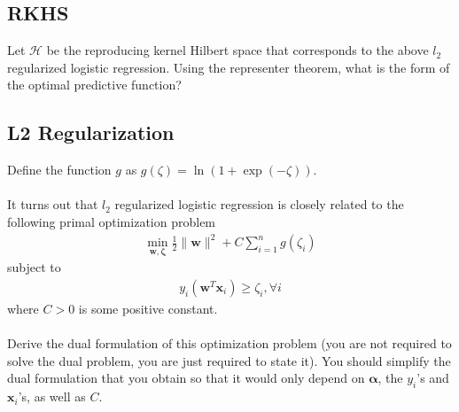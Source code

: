 \documentclass{exam}
\newcommand{\wv}{\boldsymbol{w}}
\newcommand{\xv}{\boldsymbol{x}}
\begin{document}
\subsection{RKHS} Let $\mathcal{H}$ be the reproducing kernel Hilbert space that corresponds to the above $l_2$ regularized logistic regression. Using the representer theorem, what is the form of the optimal predictive function? 

\subsection{L2 Regularization} Define the function $g$ as $g(\zeta)=\ln(1+\exp(-\zeta))$. 
\\\\It turns out that $l_2$ regularized logistic regression is closely related to the following primal optimization problem 
\begin{align*}
\min_{\mathbf{w}, \bm\zeta} \frac{1}{2}\|\wv \|^2 + C\sum_{i=1}^n g(\zeta_i)
\end{align*}
subject to
\begin{align*}
y_i(\wv^T\mathbf{x}_i) \geq \zeta_i, \forall i
\end{align*}
where $C > 0$ is some positive constant. 
\\\\Derive the dual formulation of this optimization problem (you are not required to solve the dual problem, you are just required to state it). You should simplify the dual formulation that you obtain so that it would only depend on $\bm\alpha$, the $y_i$'s and $\xv_i$'s, as well as $C$. 
\end{document}
